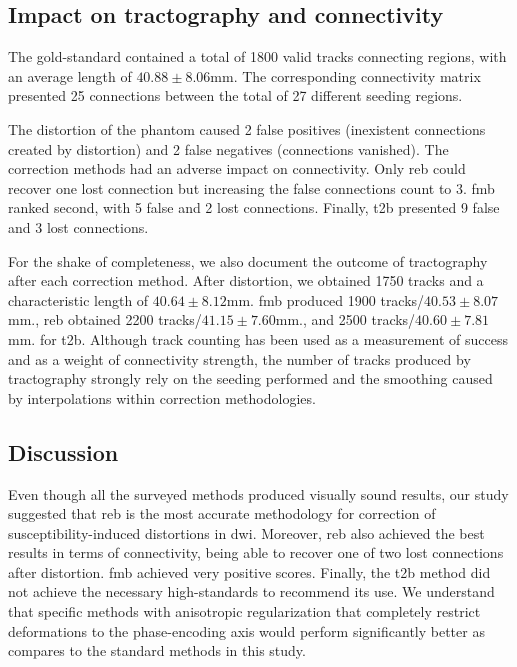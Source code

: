 \subsection{Impact on tractography and connectivity}

The gold-standard contained a total of 1800 valid tracks
connecting regions, with an average length of $40.88\pm8.06$mm.
The corresponding connectivity matrix presented 25 connections 
between the total of 27 different seeding regions.

The distortion of the phantom caused 2 false positives (inexistent 
connections created by distortion) and 2 false negatives 
(connections vanished). The correction methods had an adverse impact
on connectivity. Only \gls*{reb} could recover one lost connection
but increasing the false connections count to 3.
\gls*{fmb} ranked second, with 5 false and 2 lost connections.
Finally, \gls*{t2b} presented 9 false and 3 lost connections.

For the shake of completeness, we also document the outcome
of tractography after each correction method. After distortion,
we obtained 1750 tracks and a characteristic length of 
$40.64\pm8.12$mm.
\gls*{fmb} produced 1900 tracks/$40.53\pm8.07$mm., \gls*{reb}
obtained 2200 tracks/$41.15\pm7.60$mm., and 2500 
tracks/$40.60\pm7.81$mm. for \gls*{t2b}. Although track counting has
been used as a measurement of success and as a weight of connectivity 
strength, the number of tracks produced by tractography strongly rely
on the seeding performed and the smoothing caused by interpolations 
within correction methodologies.

\subsection{Discussion}

Even though all the surveyed methods produced visually 
sound results, our study suggested that \gls*{reb} is the 
most accurate methodology for correction of susceptibility-induced
distortions in \gls*{dwi}. Moreover, \gls*{reb} also achieved
the best results in terms of connectivity, being able to recover
one of two lost connections after distortion. \Gls*{fmb} achieved 
very positive scores. Finally, the \gls*{t2b} method did not achieve
the necessary high-standards to recommend its use. We understand
that specific methods with anisotropic regularization that completely
restrict deformations to the phase-encoding axis would perform
significantly better as compares to the standard methods in this study.

